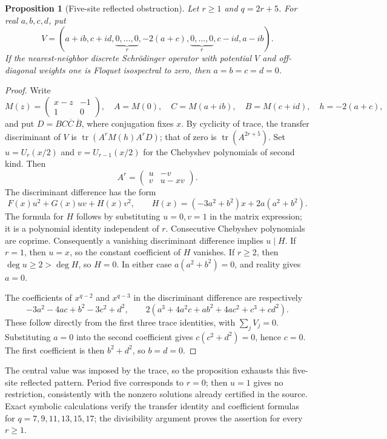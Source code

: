 \documentclass[11pt,a4paper]{article}
\newtheorem{proposition}[theorem]{Proposition}
\theoremstyle{definition}\newtheorem{definition}[theorem]{Definition}
\theoremstyle{remark}\newtheorem{remark}[theorem]{Remark}
\begin{document}
\begin{proposition}[Five-site reflected obstruction]
Let $r\geq1$ and $q=2r+5$. For real $a,b,c,d$, put
\[
 V=(a+ib,c+id,\underbrace{0,\ldots,0}_{r},-2(a+c),
       \underbrace{0,\ldots,0}_{r},c-id,a-ib).
\]
If the nearest-neighbor discrete Schr\"odinger operator with potential
$V$ and off-diagonal weights one is Floquet isospectral to zero, then
$a=b=c=d=0$.
\end{proposition}
\begin{proof}
Write
\[
 M(z)=\begin{pmatrix}x-z&-1\\1&0\end{pmatrix},\quad
 A=M(0),\quad C=M(a+ib),\quad B=M(c+id),\quad h=-2(a+c),
\]
and put $D=BC\overline C\,\overline B$, where conjugation fixes $x$.
By cyclicity of trace, the transfer discriminant of $V$ is
$\operatorname{tr}(A^rM(h)A^rD)$; that of zero is
$\operatorname{tr}(A^{2r+5})$. Set
$u=U_r(x/2)$ and $v=U_{r-1}(x/2)$ for the Chebyshev polynomials of
second kind. Then
\[
 A^r=\begin{pmatrix}u&-v\\v&u-xv\end{pmatrix}.
\]
The discriminant difference has the form
\[
 F(x)u^2+G(x)uv+H(x)v^2,
 \qquad H(x)=(-3a^2+b^2)x+2a(a^2+b^2).
\]
The formula for $H$ follows by substituting $u=0,v=1$ in the matrix
expression; it is a polynomial identity independent of $r$.
Consecutive Chebyshev polynomials are coprime. Consequently a vanishing
discriminant difference implies $u\mid H$.
If $r=1$, then $u=x$, so the constant coefficient of $H$ vanishes.
If $r\geq2$, then $\deg u\geq2>\deg H$, so $H=0$.
In either case $a(a^2+b^2)=0$, and reality gives $a=0$.

The coefficients of $x^{q-2}$ and $x^{q-3}$ in the discriminant
difference are respectively
\[
 -3a^2-4ac+b^2-3c^2+d^2,
 \qquad
 2(a^3+4a^2c+ab^2+4ac^2+c^3+cd^2).
\]
These follow directly from the first three trace identities, with
$\sum_j V_j=0$. Substituting $a=0$ into the second coefficient gives
$c(c^2+d^2)=0$, hence $c=0$. The first coefficient is then $b^2+d^2$,
so $b=d=0$.
\end{proof}

The central value was imposed by the trace, so the proposition exhausts
this five-site reflected pattern. Period five corresponds to $r=0$;
then $u=1$ gives no restriction, consistently with the nonzero solutions
already certified in the source. Exact symbolic calculations verify the
transfer identity and coefficient formulas for $q=7,9,11,13,15,17$;
the divisibility argument proves the assertion for every $r\geq1$.
\end{document}
